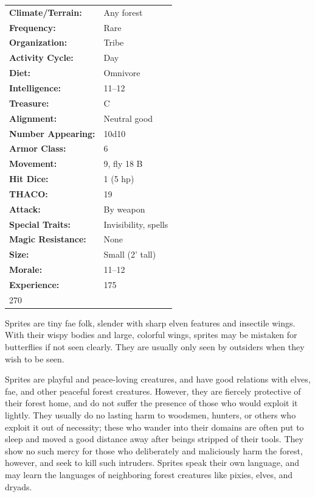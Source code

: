 \begin{multicols}{2}
\begin{minipage}{\columnwidth}
\noindent \begin{tabular}{p{}p{}}
\textbf{Climate/Terrain:}	& Any forest	\\
\textbf{Frequency:} 		& Rare	\\
\textbf{Organization:} 		& Tribe	\\
\textbf{Activity Cycle:} 	& Day	\\
\textbf{Diet:} 				& Omnivore	\\
\textbf{Intelligence:} 		& 11--12	\\
\textbf{Treasure:} 			& C	\\
\textbf{Alignment:} 		& Neutral good	\\
\hline
\textbf{Number Appearing:} 	& 10d10	\\
\textbf{Armor Class:} 		& 6	\\
\textbf{Movement:} 			& 9, fly 18 B	\\
\textbf{Hit Dice:} 			& 1 (5 hp)	\\
\textbf{THACO:} 			& 19	\\
\textbf{Attack:} 			& By weapon	\\
\textbf{Special Traits:} & Invisibility, spells	\\
\textbf{Magic Resistance:} 	& None	\\
\textbf{Size:} 				& Small (2' tall)	\\
\textbf{Morale:} 			& 11--12	\\
\textbf{Experience:} 		& 175	\\ 270
\end{tabular}

\end{minipage}

Sprites are tiny fae folk, slender with sharp elven features and insectile wings. With their wispy bodies and large, colorful wings, sprites may be mistaken for butterflies if not seen clearly. They are usually only seen by outsiders when they wish to be seen.

Sprites are playful and peace-loving creatures, and have good relations with elves, fae, and other peaceful forest creatures. However, they are fiercely protective of their forest home, and do not suffer the presence of those who would exploit it lightly. They usually do no lasting harm to woodsmen, hunters, or others who exploit it out of necessity; these who wander into their domains are often put to sleep and moved a good distance away after beings stripped of their tools. They show no such mercy for those who deliberately and maliciously harm the forest, however, and seek to kill such intruders. Sprites speak their own language, and may learn the languages of neighboring forest creatures like pixies, elves, and dryads.


\end{multicols}
